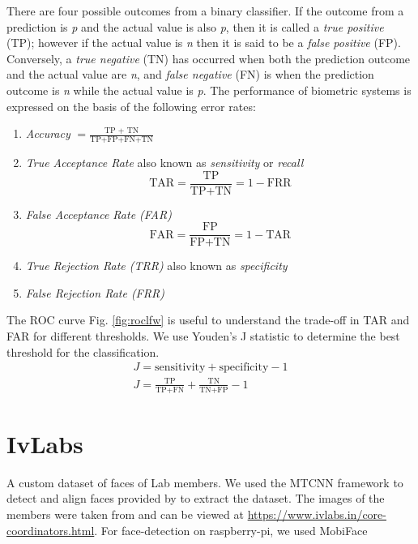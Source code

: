 \documentclass[aps,prb,twocolumn,superscriptaddress,floatfix,longbibliography, nofootinbib]{revtex4-2}
\newif\ifptitle
\newif\ifpnumber
\newcounter{para}
\newcommand\ptitle[1]{\par\refstepcounter{para}
{\ifpnumber{\noindent\textcolor{lightgray}{\textbf{\thepara}}\indent}\fi}
{\ifptitle{\textbf{[{#1}]}}\fi}}
\begin{document}
\ptitle{Biometrics} There are four possible outcomes from a binary classifier. If the outcome from a prediction is \textit{p} and the actual value is also \textit{p}, then it is called a \textit{true positive} (TP); however if the actual value is \textit{n} then it is said to be a \textit{false positive} (FP). Conversely, a \textit{true negative} (TN) has occurred when both the prediction outcome and the actual value are \textit{n}, and \textit{false negative} (FN) is when the prediction outcome is \textit{n} while the actual value is \textit{p}. The performance of biometric systems is expressed on the basis of the following error rates:
\begin{raggedright}
\begin{enumerate}
\item \textit{Accuracy} $\displaystyle{ = \frac{\text{TP + TN}}{\text{TP+FP+FN+TN}}}$
\item \textit{True Acceptance Rate} also known as \textit{sensitivity} or \textit{recall}
\begin{equation}
\nonumber \displaystyle{\text{TAR} = \frac{\text{TP}}{\text{TP+TN}} = 1-\text{FRR}}
\end{equation}
\item \textit{False Acceptance Rate (FAR)}
\begin{equation}
\nonumber \displaystyle{\text{FAR} = \frac{\text{FP}}{\text{FP+TN}} = 1-\text{TAR}}
\end{equation}
\item \textit{True Rejection Rate (TRR)} also known as \textit{specificity}
\item \textit{False Rejection Rate (FRR)}
\end{enumerate}
\end{raggedright}
The ROC curve Fig. \ref{fig:roclfw} is useful to understand the trade-off in TAR and FAR for different thresholds. We use Youden’s J statistic to determine the best threshold for the classification. 
\begin{eqnarray}
\nonumber {\displaystyle J={\text{sensitivity}}+{\text{specificity}}-1} \\
\nonumber {\displaystyle J={\frac {\text{TP}}{{\text{TP}}+{\text{FN}}}}+{\frac {\text{TN}}{{\text{TN}}+{\text{FP}}}}-1}
\end{eqnarray}

\section{\label{sec:IvLabs}IvLabs}
\ptitle{Dataset Information} A custom dataset of faces of Lab members. We used the MTCNN \cite{Zhang_2016} framework to detect and align faces provided by \textcite{davidfacenet} to extract the dataset. The images of the members were taken from and can be viewed at \url{https://www.ivlabs.in/core-coordinators.html}. For face-detection on raspberry-pi, we used MobiFace \cite{https://doi.org/10.48550/arxiv.1811.11080}
\end{document}
